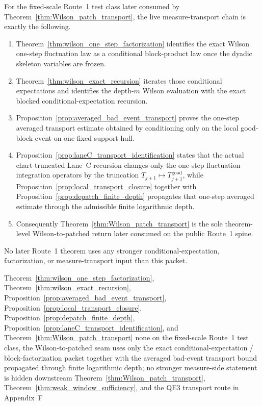 \documentclass[preprint,aip,jmp,amsmath,amssymb,nofootinbib]{revtex4-2}
\begin{document}
\begin{proposition}\label{prop:route1_measure_pipeline_ledger}
For the fixed-scale Route~1 test class later consumed by Theorem~\ref{thm:Wilson_patch_transport}, the live measure-transport chain is exactly the following.
\begin{enumerate}[label=\textup{(\roman*)},leftmargin=2.25em]
\item Theorem~\ref{thm:wilson_one_step_factorization} identifies the exact Wilson one-step fluctuation law as a conditional block-product law once the dyadic skeleton variables are frozen.
\item Theorem~\ref{thm:wilson_exact_recursion} iterates those conditional expectations and identifies the depth-$m$ Wilson evaluation with the exact blocked conditional-expectation recursion.
\item Proposition~\ref{prop:averaged_bad_event_transport} proves the one-step averaged transport estimate obtained by conditioning only on the local good-block event on one fixed support hull.
\item Proposition~\ref{prop:laneC_transport_identification} states that the actual chart-truncated Lane~C recursion changes only the one-step fluctuation integration operators by the truncation $T_{j+1}\mapsto T_{j+1}^{\mathrm{good}}$, while Proposition~\ref{prop:local_transport_closure} together with Proposition~\ref{prop:depatch_finite_depth} propagates that one-step averaged estimate through the admissible finite logarithmic depth.
\item Consequently Theorem~\ref{thm:Wilson_patch_transport} is the sole theorem-level Wilson-to-patched return later consumed on the public Route~1 spine.
\end{enumerate}
No later Route~1 theorem uses any stronger conditional-expectation, factorization, or measure-transport input than this packet.
\end{proposition}

\dependencyledger
  {Theorem~\ref{thm:wilson_one_step_factorization}, Theorem~\ref{thm:wilson_exact_recursion}, Proposition~\ref{prop:averaged_bad_event_transport}, Proposition~\ref{prop:local_transport_closure}, Proposition~\ref{prop:depatch_finite_depth}, Proposition~\ref{prop:laneC_transport_identification}, and Theorem~\ref{thm:Wilson_patch_transport}}
  {none}
  {on the fixed-scale Route~1 test class, the Wilson-to-patched seam uses only the exact conditional-expectation / block-factorization packet together with the averaged bad-event transport bound propagated through finite logarithmic depth; no stronger measure-side statement is hidden downstream}
  {Theorem~\ref{thm:Wilson_patch_transport}, Theorem~\ref{thm:weak_window_sufficiency}, and the QE3 transport route in Appendix~F}
\end{document}
